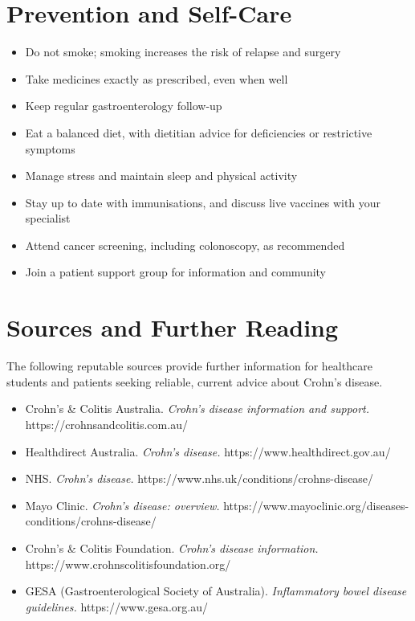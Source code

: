 \section*{Prevention and Self-Care}
\begin{itemize}
    \item Do not smoke; smoking increases the risk of relapse and surgery
    \item Take medicines exactly as prescribed, even when well
    \item Keep regular gastroenterology follow-up
    \item Eat a balanced diet, with dietitian advice for deficiencies or restrictive symptoms
    \item Manage stress and maintain sleep and physical activity
    \item Stay up to date with immunisations, and discuss live vaccines with your specialist
    \item Attend cancer screening, including colonoscopy, as recommended
    \item Join a patient support group for information and community
\end{itemize}

\section*{Sources and Further Reading}
The following reputable sources provide further information for healthcare students and patients seeking reliable, current advice about Crohn's disease.

\begin{itemize}
    \item Crohn's \& Colitis Australia. \textit{Crohn's disease information and support.} https://crohnsandcolitis.com.au/
    \item Healthdirect Australia. \textit{Crohn's disease.} https://www.healthdirect.gov.au/
    \item NHS. \textit{Crohn's disease.} https://www.nhs.uk/conditions/crohns-disease/
    \item Mayo Clinic. \textit{Crohn's disease: overview.} https://www.mayoclinic.org/diseases-conditions/crohns-disease/
    \item Crohn's \& Colitis Foundation. \textit{Crohn's disease information.} https://www.crohnscolitisfoundation.org/
    \item GESA (Gastroenterological Society of Australia). \textit{Inflammatory bowel disease guidelines.} https://www.gesa.org.au/
\end{itemize}
